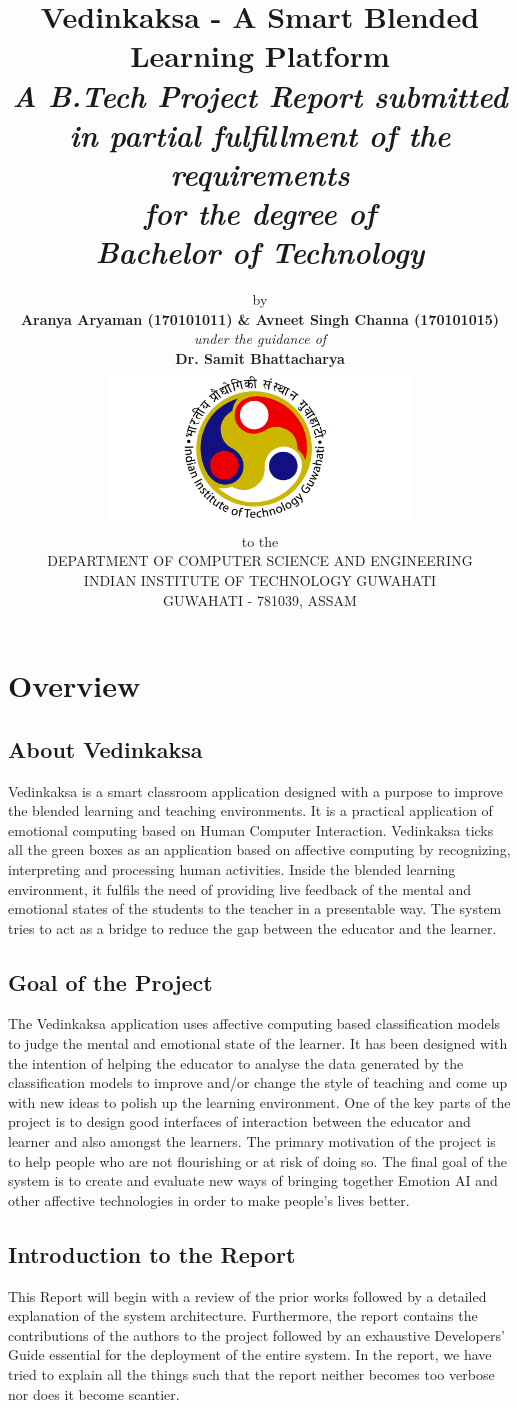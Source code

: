 \documentclass[10pt]{report}
\title{\textbf{Vedinkaksa - A Smart Blended Learning Platform} \\  \textit{ A B.Tech Project Report submitted \\ in partial fulfillment of the requirements \\ for the degree of \\  Bachelor of Technology}}
\author{by \\ \textbf{Aranya Aryaman (170101011) \& Avneet Singh Channa (170101015)} \\ \textit{under the guidance of} \\ \textbf{Dr. Samit Bhattacharya} \\ \includegraphics[width=8cm]{iitg.png} \\ to the \\ 
DEPARTMENT OF COMPUTER SCIENCE AND ENGINEERING \\
INDIAN INSTITUTE OF TECHNOLOGY GUWAHATI \\
GUWAHATI - 781039, ASSAM}
\date{}
\begin{document}
\maketitle

\tableofcontents
\chapter{Overview}
\section{About Vedinkaksa}
Vedinkaksa is a smart classroom application designed with a purpose to improve the blended learning and teaching environments. It is a practical application of emotional computing based on Human Computer Interaction. Vedinkaksa ticks all the green boxes as an application based on affective computing by recognizing, interpreting and processing human activities. Inside the blended learning environment, it fulfils the need of providing live feedback of the mental and emotional states of the students to the teacher in a presentable way. The system tries to act as a bridge to reduce the gap between the educator and the learner. 
\section{Goal of the Project}
The Vedinkaksa application uses affective computing based classification models to judge the mental and emotional state of the learner. It has been designed with the intention of helping the educator to analyse the data generated by the classification models to improve and/or change the style of teaching and come up with new ideas to polish up the learning environment. One of the key parts of the project is to design good interfaces of interaction between the educator and learner and also amongst the learners. The primary motivation of the project is to help people who are not flourishing or at risk of doing so. The final goal of the system is to create and evaluate new ways of bringing together Emotion AI and other affective technologies in order to make people's lives better.   
\section{Introduction to the Report}
This Report will begin with a review of the prior works followed by a detailed explanation of the system architecture. Furthermore, the report contains the contributions of the authors to the project followed by an exhaustive Developers' Guide essential for the deployment of the entire system. In the report, we have tried to explain all the things such that the report neither becomes too verbose nor does it become scantier.
\end{document}
